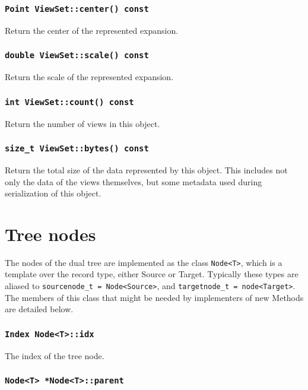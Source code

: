 \subsubsection{\texttt{Point ViewSet::center() const}}

Return the center of the represented expansion.

\subsubsection{\texttt{double ViewSet::scale() const}}

Return the scale of the represented expansion.

\subsubsection{\texttt{int ViewSet::count() const}}

Return the number of views in this object.

\subsubsection{\texttt{size\_t ViewSet::bytes() const}}

Return the total size of the data represented by this object. This includes
not only the data of the views themselves, but some metadata used during
serialization of this object.


\section{Tree nodes}

The nodes of the dual tree are implemented as the class \texttt{Node<T>}, which
is a template over the record type, either Source or Target. Typically these
types are aliased to \texttt{sourcenode\_t = Node<Source>}, and
\texttt{targetnode\_t = node<Target>}. The members of this class that might be
needed by implementers of new Methods are detailed below.

\subsubsection{\texttt{Index Node<T>::idx}}

The index of the tree node.

\subsubsection{\texttt{Node<T> *Node<T>::parent}}

